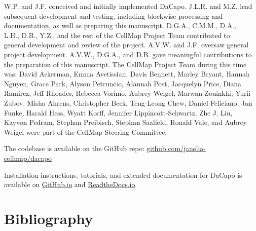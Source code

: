 \documentclass[times, twoside]{zHenriquesLab-StyleBioRxiv}
\begin{document}
\begin{contributions}
W.P. and J.F. conceived and initially implemented DaCapo. J.L.R. and M.Z. lead subsequent development and testing, including blockwise processing and documentation, as well as preparing this manuscript. D.G.A., C.M.M., D.A., L.H., D.B., Y.Z., and the rest of the CellMap Project Team contributed to general development and review of the project. A.V.W. and J.F. oversaw general project development. A.V.W., D.G.A., and D.B. gave meaningful contributions to the preparation of this manuscript. The CellMap Project Team during this time was: David Ackerman, Emma Avetissian, Davis Bennett, Marley Bryant, Hannah Nguyen, Grace Park, Alyson Petruncio, Alannah Post, Jacquelyn Price, Diana Ramirez, Jeff Rhoades, Rebecca Vorimo, Aubrey Weigel, Marwan Zouinkhi, Yurii Zubov. Misha Ahrens, Christopher Beck, Teng-Leong Chew, Daniel Feliciano, Jan Funke, Harald Hess, Wyatt Korff, Jennifer Lippincott-Schwartz, Zhe J. Liu, Kayvon Pedram, Stephan Preibisch, Stephan Saalfeld, Ronald Vale, and Aubrey Weigel were part of the CellMap Steering Committee.
\end{contributions}

\begin{code}
The codebase is available on the GitHub repo: \href{https://github.com/janelia-cellmap/dacapo}{github.com/janelia-cellmap/dacapo}
\end{code}

\begin{supplementary}
Installation instructions, tutorials, and extended documentation for DaCapo is available on \href{https://janelia-cellmap.github.io/dacapo/}{GitHub.io} and \href{https://dacapo.readthedocs.io/en/stable/}{ReadtheDocs.io}.
\end{supplementary}

\section*{Bibliography}

\captionsetup*{format=largeformat}

\end{document}
